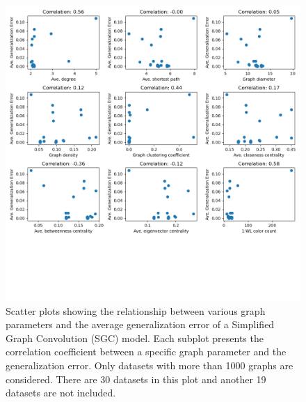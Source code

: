 \begin{figure}[H]
    \centering
    \includegraphics[width=\textwidth]{images/correlation_ignore_less_than_1000_SGC.png}
    \caption{Scatter plots showing the relationship between various graph parameters and the average generalization error of a Simplified Graph Convolution (SGC) model. Each subplot presents the correlation coefficient between a specific graph parameter and the generalization error. Only datasets with more than 1000 graphs are considered. There are 30 datasets in this plot and another 19 datasets are not included.}
    \label{fig:correlation_ignore_less_than_1000_SGC}
\end{figure}

